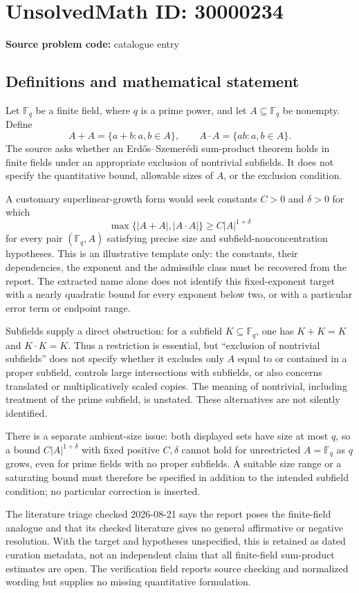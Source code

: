 \documentclass[11pt]{article}
\newcommand{\F}{\mathbb{F}}
\begin{document}
\section*{UnsolvedMath ID: 30000234}
\textbf{Source problem code:} catalogue entry
\subsection{Definitions and mathematical statement}
Let \(\F_q\) be a finite field, where \(q\) is a prime power, and let \(A\subseteq\F_q\) be nonempty. Define
\[
 A+A=\{a+b:a,b\in A\},\qquad
 A\cdot A=\{ab:a,b\in A\}.
\]
The source asks whether an Erd\H{o}s--Szemer\'edi sum-product theorem holds in finite fields under an appropriate exclusion of nontrivial subfields. It does not specify the quantitative bound, allowable sizes of \(A\), or the exclusion condition.

A customary superlinear-growth form would seek constants \(C>0\) and \(\delta>0\) for which
\[
 \max\{|A+A|,|A\cdot A|\}\geq C|A|^{1+\delta}
\]
for every pair \((\F_q,A)\) satisfying precise size and subfield-nonconcentration hypotheses. This is an illustrative template only: the constants, their dependencies, the exponent and the admissible class must be recovered from the report. The extracted name alone does not identify this fixed-exponent target with a nearly quadratic bound for every exponent below two, or with a particular error term or endpoint range.

Subfields supply a direct obstruction: for a subfield \(K\subseteq\F_q\), one has \(K+K=K\) and \(K\cdot K=K\). Thus a restriction is essential, but ``exclusion of nontrivial subfields'' does not specify whether it excludes only \(A\) equal to or contained in a proper subfield, controls large intersections with subfields, or also concerns translated or multiplicatively scaled copies. The meaning of nontrivial, including treatment of the prime subfield, is unstated. These alternatives are not silently identified.

There is a separate ambient-size issue: both displayed sets have size at most \(q\), so a bound \(C|A|^{1+\delta}\) with fixed positive \(C,\delta\) cannot hold for unrestricted \(A=\F_q\) as \(q\) grows, even for prime fields with no proper subfields. A suitable size range or a saturating bound must therefore be specified in addition to the intended subfield condition; no particular correction is inserted.

The literature triage checked 2026-08-21 says the report poses the finite-field analogue and that its checked literature gives no general affirmative or negative resolution. With the target and hypotheses unspecified, this is retained as dated curation metadata, not an independent claim that all finite-field sum-product estimates are open. The verification field reports source checking and normalized wording but supplies no missing quantitative formulation.
\end{document}
